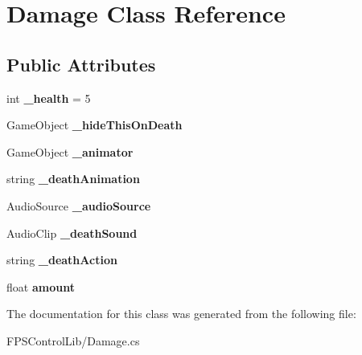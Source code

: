 \hypertarget{class_damage}{\section{Damage Class Reference}
\label{class_damage}
}
\subsection*{Public Attributes}
\begin{DoxyCompactItemize}
\item 
\hypertarget{class_damage_a7fa98607c0341a041e2027e6d43cc04a}{int {\bfseries \-\_\-health} = 5}\label{class_damage_a7fa98607c0341a041e2027e6d43cc04a}

\item 
\hypertarget{class_damage_a414e8f9e5b591229f8bde8e943b54739}{Game\-Object {\bfseries \-\_\-hide\-This\-On\-Death}}\label{class_damage_a414e8f9e5b591229f8bde8e943b54739}

\item 
\hypertarget{class_damage_a7dccd08d8d802822637fcf926420ed50}{Game\-Object {\bfseries \-\_\-animator}}\label{class_damage_a7dccd08d8d802822637fcf926420ed50}

\item 
\hypertarget{class_damage_a80bc9775179a2d39af6565dfc4eccd2a}{string {\bfseries \-\_\-death\-Animation}}\label{class_damage_a80bc9775179a2d39af6565dfc4eccd2a}

\item 
\hypertarget{class_damage_a9d65be76038d465f0c14fb076f589ffb}{Audio\-Source {\bfseries \-\_\-audio\-Source}}\label{class_damage_a9d65be76038d465f0c14fb076f589ffb}

\item 
\hypertarget{class_damage_ac16d078ec21b3792563880dac274c56a}{Audio\-Clip {\bfseries \-\_\-death\-Sound}}\label{class_damage_ac16d078ec21b3792563880dac274c56a}

\item 
\hypertarget{class_damage_a93cbc92fca0631d6c4a72b566f42a80a}{string {\bfseries \-\_\-death\-Action}}\label{class_damage_a93cbc92fca0631d6c4a72b566f42a80a}

\item 
\hypertarget{class_damage_a2b382e480bf1701cd4f9819d63f9100d}{float {\bfseries amount}}\label{class_damage_a2b382e480bf1701cd4f9819d63f9100d}

\end{DoxyCompactItemize}


The documentation for this class was generated from the following file\-:\begin{DoxyCompactItemize}
\item 
F\-P\-S\-Control\-Lib/Damage.\-cs\end{DoxyCompactItemize}

